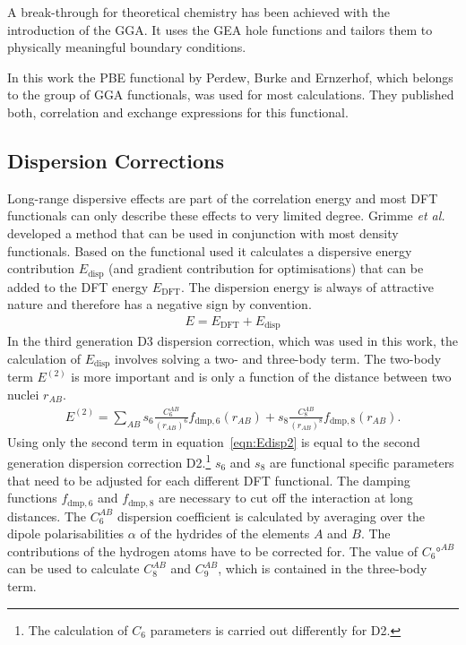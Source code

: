 A break-through for theoretical chemistry has been achieved with the
introduction of the \ac{GGA}. It uses the \ac{GEA} hole functions and tailors
them to physically meaningful boundary conditions. 

In this work the PBE functional by Perdew, Burke and Ernzerhof\autocite{Perdew_GeneralizedGradientApproximation_1996,PerdewGeneralizedGradientApproximation1997},
which belongs to the group of \ac{GGA} functionals, was used for most
calculations. They published both, correlation and exchange expressions for
this functional.

\subsection{Dispersion Corrections}
\label{sec:dispersioncorrections}

Long-range dispersive effects are part of the correlation energy and most
\ac{DFT} functionals can only describe these effects to very limited degree.
Grimme \textit{et al.} developed a method that can be used in conjunction with
most density functionals. Based on the functional used it calculates a
dispersive energy contribution $E_\text{disp}$ (and gradient contribution for
optimisations) that can be added to the \ac{DFT} energy $E_\text{DFT}$. The
dispersion energy is always of attractive nature and therefore has a negative
sign by convention.
%
\begin{align}
	E = E_\text{DFT} + E_\text{disp}
\end{align}
%
In the third generation D3 dispersion correction, which was used in this work,
the calculation of $E_\text{disp}$ involves solving a two- and three-body term.
The two-body term $E^{(2)}$ is more important and is only a function of the
distance between two nuclei $r_{AB}$.
%
\begin{align}
	E^{(2)}=\sum\limits_{AB}s_6\frac{C_6^{AB}}{\left(r_{AB}\right)^6}f_{\text{dmp},6}(r_{AB}) + s_8\frac{C_8^{AB}}{\left(r_{AB}\right)^8}f_{\text{dmp},8}(r_{AB}).\label{eqn:Edisp2}
\end{align}
%
Using only the second term in equation~\eqref{eqn:Edisp2} is equal to the
second generation dispersion correction D2.\footnote{The calculation of $C_6$
parameters is carried out differently for D2.} $s_6$ and $s_8$ are functional
specific parameters that need to be adjusted for each different \ac{DFT}
functional. The damping functions $f_{\text{dmp},6}$ and $f_{\text{dmp},8}$ are
necessary to cut off the interaction at long distances. The $C_6^{AB}$
dispersion coefficient is calculated by averaging over the dipole
polarisabilities $\alpha$ of the hydrides of the elements $A$ and $B$. The
contributions of the hydrogen atoms have to be corrected for. The value of
$C_6°^{AB}$ can be used to calculate $C_8^{AB}$ and $C_9^{AB}$, which is
contained in the three-body term.

